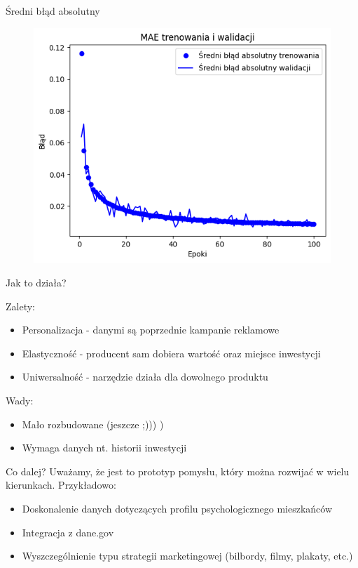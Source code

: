 \documentclass{beamer}
\begin{document}
\begin{frame}{Średni błąd absolutny}
\begin{figure}
    \centering
    \includegraphics[width=0.7\linewidth]{mae.png}
\end{figure}
\end{frame}


\begin{frame}[t]{Jak to działa?}

{\Large Zalety:}
\vspace{0.5cm}
\begin{itemize}
    \item Personalizacja - danymi są poprzednie kampanie reklamowe
    \item Elastyczność - producent sam dobiera wartość oraz miejsce inwestycji
    \item Uniwersalność - narzędzie działa dla dowolnego produktu
\end{itemize}

\pause

\vspace{1cm}

{\Large Wady:}
\vspace{0.5cm}
\begin{itemize}
    \item Mało rozbudowane (jeszcze ;))) )
    \item Wymaga danych nt. historii inwestycji
\end{itemize}

\end{frame}

\begin{frame}{Co dalej?}
Uważamy, że jest to prototyp pomysłu, który można rozwijać w wielu kierunkach. Przykładowo:
\begin{itemize}
    \item Doskonalenie danych dotyczących profilu psychologicznego mieszkańców
    \item Integracja z dane.gov
    \item Wyszczególnienie typu strategii marketingowej (bilbordy, filmy, plakaty, etc.)
\end{itemize}

\end{frame}
\end{document}
